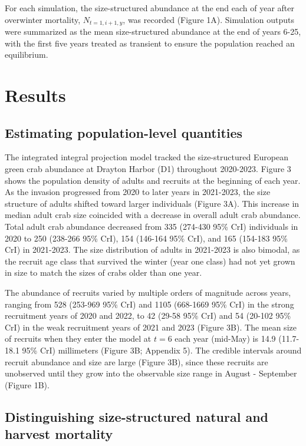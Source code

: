 \documentclass{article}
\begin{document}
For each simulation, the size-structured abundance at the end each of year after overwinter mortality, $N_{t=1,i+1,y}$, was recorded (Figure 1A). Simulation outputs were summarized as the mean size-structured abundance at the end of years 6-25, with the first five years treated as transient to ensure the population reached an equilibrium.

\section{Results}

\subsection{Estimating population-level quantities}

The integrated integral projection model tracked the size-structured European green crab abundance at Drayton Harbor (D1) throughout 2020-2023. Figure 3 shows the population density of adults and recruits at the beginning of each year. As the invasion progressed from 2020 to later years in 2021-2023, the size structure of adults shifted toward larger individuals (Figure 3A). This increase in median adult crab size coincided with a decrease in overall adult crab abundance. Total adult crab abundance decreased from 335 (274-430 95\% CrI) individuals in 2020 to 250 (238-266 95\% CrI), 154 (146-164 95\% CrI), and 165 (154-183 95\% CrI) in 2021-2023. The size distribution of adults in 2021-2023 is also bimodal, as the recruit age class that survived the winter (year one class) had not yet grown in size to match the sizes of crabs older than one year.

The abundance of recruits varied by multiple orders of magnitude across years, ranging from 528 (253-969 95\% CrI) and 1105 (668-1669 95\% CrI) in the strong recruitment years of 2020 and 2022, to 42 (29-58 95\% CrI) and 54 (20-102 95\% CrI) in the weak recruitment years of 2021 and 2023 (Figure 3B). The mean size of recruits when they enter the model at $t = 6$ each year (mid-May) is 14.9 (11.7-18.1 95\% CrI) millimeters (Figure 3B; Appendix 5). The credible intervals around recruit abundance and size are large (Figure 3B), since these recruits are unobserved until they grow into the observable size range in August - September (Figure 1B).

\subsection{Distinguishing size-structured natural and harvest mortality}
\end{document}
